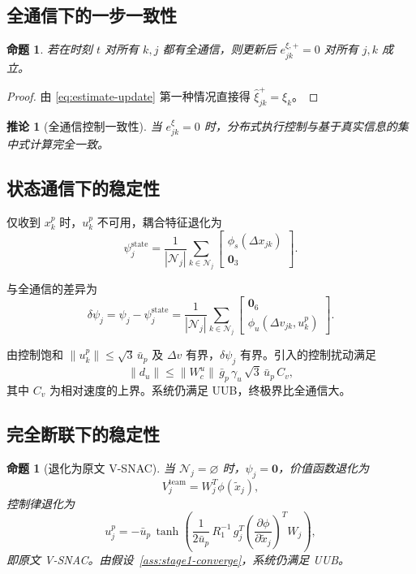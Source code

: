 \documentclass[12pt,a4paper]{ctexart}
\newtheorem{proposition}[theorem]{命题}
\newtheorem{corollary}[theorem]{推论}
\begin{document}
\subsection{全通信下的一步一致性}

\begin{proposition}\label{prop:full-consistency}
若在时刻 $t$ 对所有 $k, j$ 都有全通信，则更新后
$e_{jk}^{\xi,+} = 0$ 对所有 $j, k$ 成立。
\end{proposition}

\begin{proof}
由 \eqref{eq:estimate-update} 第一种情况直接得 $\hat{\xi}_{jk}^+ = \xi_k$。
\end{proof}

\begin{corollary}[全通信控制一致性]
当 $e_{jk}^\xi = 0$ 时，分布式执行控制与基于真实信息的集中式计算完全一致。
\end{corollary}

\subsection{状态通信下的稳定性}

仅收到 $x_k^p$ 时，$u_k^p$ 不可用，耦合特征退化为
\[
\psi_j^{\mathrm{state}} = \frac{1}{|\mathcal{N}_j|} \sum_{k \in \mathcal{N}_j} \begin{bmatrix} \phi_s(\Delta x_{jk}) \\ \bm{0}_3 \end{bmatrix}.
\]

与全通信的差异为
\[
\delta\psi_j = \psi_j - \psi_j^{\mathrm{state}} = \frac{1}{|\mathcal{N}_j|} \sum_{k \in \mathcal{N}_j} \begin{bmatrix} \bm{0}_6 \\ \phi_u(\Delta v_{jk}, u_k^p) \end{bmatrix}.
\]

由控制饱和 $\|u_k^p\| \le \sqrt{3}\,\bar{u}_p$ 及 $\Delta v$ 有界，$\delta\psi_j$ 有界。引入的控制扰动满足
\begin{equation}
\|d_u\| \le \|W_c^u\|\,\bar{g}_p\,\gamma_u\,\sqrt{3}\,\bar{u}_p\,C_v,
\end{equation}
其中 $C_v$ 为相对速度的上界。系统仍满足 UUB，终极界比全通信大。

\subsection{完全断联下的稳定性}

\begin{proposition}[退化为原文 V-SNAC]\label{prop:no-comm}
当 $\mathcal{N}_j = \varnothing$ 时，$\psi_j = \bm{0}$，价值函数退化为
\[
V_j^{\mathrm{team}} = W_j^T\phi(\tilde{x}_j),
\]
控制律退化为
\[
u_j^p = -\bar{u}_p\,\tanh\!\left(\frac{1}{2\bar{u}_p}\,R_1^{-1}\,g_j^T\left(\frac{\partial\phi}{\partial\tilde{x}_j}\right)^{\!T} W_j\right),
\]
即原文 V-SNAC。由假设~\ref{ass:stage1-converge}，系统仍满足 UUB。
\end{proposition}
\end{document}
